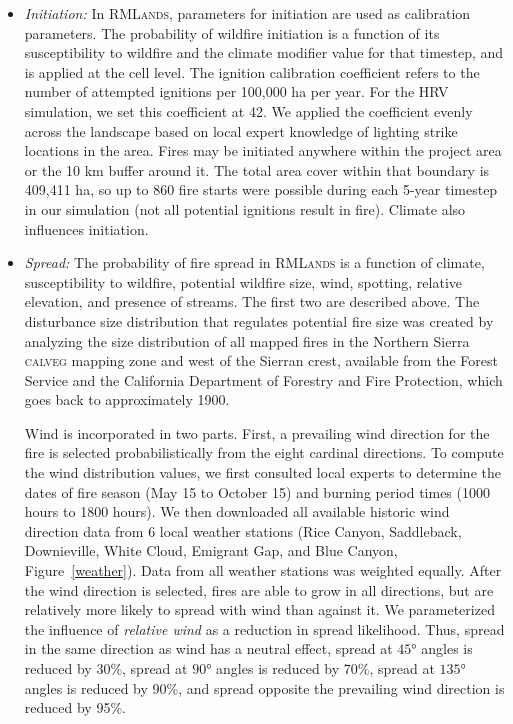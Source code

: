 \begin{itemize}
\item \emph{Initiation:} In \textsc{RMLands}, parameters for initiation are used as calibration parameters. The probability of wildfire initiation is a function of its susceptibility to wildfire and the climate modifier value for that timestep, and is applied at the cell level. The ignition calibration coefficient refers to the number of attempted ignitions per 100,000 ha per year. For the HRV simulation, we set this coefficient at 42. We applied the coefficient evenly across the landscape based on local expert knowledge of lighting strike locations in the area. Fires may be initiated anywhere within the project area or the 10 km buffer around it. The total area cover within that boundary is 409,411 ha, so up to 860 fire starts were possible during each 5-year timestep in our simulation (not all potential ignitions result in fire). Climate also influences initiation.


\item \emph{Spread:} The probability of fire spread in \textsc{RMLands} is a function of climate, susceptibility to wildfire, potential wildfire size, wind, spotting, relative elevation, and presence of streams. The first two are described above. The disturbance size distribution that regulates potential fire size was created by analyzing the size distribution of all mapped fires in the Northern Sierra \textsc{calveg} mapping zone and west of the Sierran crest, available from the Forest Service and the California Department of Forestry and Fire Protection, which goes back to approximately 1900. 

Wind is incorporated in two parts. First, a prevailing wind direction for the fire is selected probabilistically from the eight cardinal directions. To compute the wind distribution values, we first consulted local experts to determine the dates of fire season (May 15 to October 15) and burning period times (1000 hours to 1800 hours). We then downloaded all available historic wind direction data from 6 local weather stations (Rice Canyon, Saddleback, Downieville, White Cloud, Emigrant Gap, and Blue Canyon, Figure~\ref{weather}). Data from all weather stations was weighted equally. After the wind direction is selected, fires are able to grow in all directions, but are relatively more likely to spread with wind than against it. We parameterized the influence of \emph{relative wind} as a reduction in spread likelihood. Thus, spread in the same direction as wind has a neutral effect, spread at $\ang{45}$ angles is reduced by 30\%, spread at $\ang{90}$  angles is reduced by 70\%, spread at $\ang{135}$ angles is reduced by 90\%, and spread opposite the prevailing wind direction is reduced by 95\%. 


\end{itemize}
